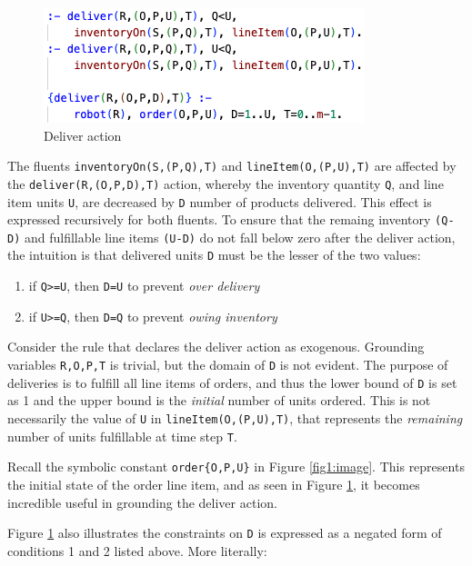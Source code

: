\documentclass[letterpaper]{article}
\newcommand{\ct}[1]{\texttt{#1}}
\begin{document}
\begin{figure}[t]
    \centering
    \includegraphics[width=0.9\columnwidth]{deliver.png}
    \caption{Deliver action}
\label{fig3:image}
\end{figure}

The fluents \ct{inventoryOn(S,(P,Q),T)} and \ct{lineItem(O,(P,U),T)} are affected by the \ct{deliver(R,(O,P,D),T)} action, whereby the inventory quantity \ct{Q}, and line item units \ct{U}, are decreased by \ct{D} number of products delivered. This effect is expressed recursively for both fluents. To ensure that the remaing inventory \ct{(Q-D)} and fulfillable line items \ct{(U-D)} do not fall below zero after the deliver action, the intuition is that delivered units \ct{D} must be the lesser of the two values:

\begin{enumerate}
    \item if \ct{Q>=U}, then \ct{D=U} to prevent \textit{over delivery}
    \item if \ct{U>=Q}, then \ct{D=Q} to prevent \textit{owing inventory}
\end{enumerate}

Consider the rule that declares the deliver action as exogenous. Grounding variables \ct{R,O,P,T} is trivial, but the domain of \ct{D} is not evident. The purpose of deliveries is to fulfill all line items of orders, and thus the lower bound of \ct{D} is set as 1 and the upper bound is the \emph{initial} number of units ordered. This is not necessarily the value of \ct{U} in \ct{lineItem(O,(P,U),T)}, that represents the \emph{remaining} number of units fulfillable at time step \ct{T}.

Recall the symbolic constant \ct{order\{O,P,U\}} in Figure \ref{fig1:image}. This represents the initial state of the order line item, and as seen in Figure \ref{fig3:image}, it becomes incredible useful in grounding the deliver action.

Figure \ref{fig3:image} also illustrates the constraints on \ct{D} is expressed as a negated form of conditions 1 and 2 listed above. More literally:
\end{document}

